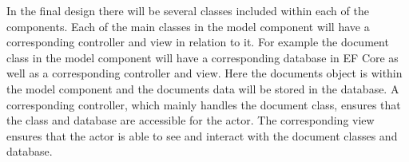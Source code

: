 In the final design there will be several classes included within each of the components.
Each of the main classes in the model component will have a corresponding controller and view in relation to it.
For example the document class in the model component will have a corresponding database in EF Core as well as a corresponding controller and view.
Here the documents object is within the model component and the documents data will be stored in the database.
A corresponding controller, which mainly handles the document class, ensures that the class and database are accessible for the actor.
The corresponding view ensures that the actor is able to see and interact with the document classes and database.
